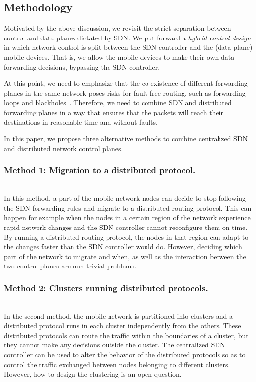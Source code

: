 \subsection{Methodology}

Motivated by the above discussion, we revisit the strict separation between control and data planes dictated by SDN. 
We put forward a \emph{hybrid control design} in which network control is split between the SDN controller and the (data plane) mobile devices. 
That is, we allow the mobile devices to make their own data forwarding decisions, bypassing the SDN controller.

At this point, we need to emphasize that the co-existence of different forwarding planes in the same network poses risks for fault-free routing, such as forwarding loops and blackholes~\cite{routing-anomalies}. Therefore, we need to combine SDN and distributed forwarding planes in a way that ensures that the packets will reach their destinations in reasonable time and without faults.

In this paper, we propose three alternative methods to combine centralized SDN and distributed network control planes. 

\subsubsection{Method 1: Migration to a distributed protocol.} ~\\
In this method, a part of the mobile network nodes can decide to stop following the SDN forwarding rules and migrate to a distributed routing protocol. This can happen for example when the nodes in a certain region of the network experience rapid network changes and the SDN controller cannot reconfigure them on time. By running a distributed routing protocol, the nodes in that region can adapt to the changes faster than the SDN controller would do. However, deciding which part of the network to migrate and when, as well as the interaction between the two control planes are non-trivial problems.

\subsubsection{Method 2: Clusters running distributed protocols.} ~\\
In the second method, the mobile network is partitioned into clusters and a distributed protocol runs in each cluster independently from the others.
These distributed protocols can route the traffic within the boundaries of a cluster, but they cannot make any decisions outside the cluster. 
The centralized SDN controller can be used to alter the behavior of the distributed protocols so as to control the traffic exchanged between nodes belonging to different clusters. However, how to design the clustering is an open question.

